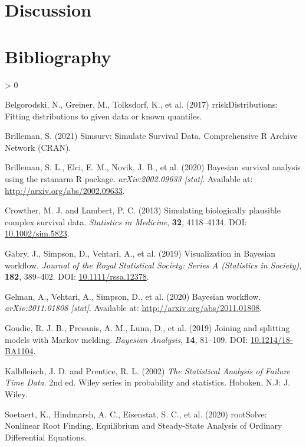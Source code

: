 \documentclass[
  10pt,
  a4paper,
]{article}
\newlength{\cslhangindent}
\newenvironment{CSLReferences}[2] %
 {%
  \setlength{\parindent}{0pt}
  \ifodd #1 \everypar{\setlength{\hangindent}{\cslhangindent}}\ignorespaces\fi
  \ifnum #2 > 0
  \setlength{\parskip}{#2\baselineskip}
  \fi
 }%
 {}
\begin{document}
\hypertarget{discussion}{%
\section{Discussion}\label{discussion}}

\hypertarget{bibliography}{%
\section{Bibliography}\label{bibliography}}

\hypertarget{refs}{}
\begin{CSLReferences}{1}{0}
\leavevmode\hypertarget{ref-belgorodski_rriskdistributions_2017}{}%
Belgorodski, N., Greiner, M., Tolksdorf, K., et al. (2017)
{rriskDistributions}: {Fitting} distributions to given data or known
quantiles.

\leavevmode\hypertarget{ref-brilleman_simsurv_2021}{}%
Brilleman, S. (2021) Simsurv: {Simulate Survival Data}. Comprehensive R
Archive Network (CRAN).

\leavevmode\hypertarget{ref-brilleman_bayesian_2020}{}%
Brilleman, S. L., Elci, E. M., Novik, J. B., et al. (2020) Bayesian
survival analysis using the rstanarm {R} package. \emph{arXiv:2002.09633
{[}stat{]}}. Available at: \url{http://arxiv.org/abs/2002.09633}.

\leavevmode\hypertarget{ref-crowther_simulating_2013}{}%
Crowther, M. J. and Lambert, P. C. (2013) Simulating biologically
plausible complex survival data. \emph{Statistics in Medicine},
\textbf{32}, 4118--4134. DOI:
\href{https://doi.org/10.1002/sim.5823}{10.1002/sim.5823}.

\leavevmode\hypertarget{ref-gabry_visualization_2019}{}%
Gabry, J., Simpson, D., Vehtari, A., et al. (2019) Visualization in
{Bayesian} workflow. \emph{Journal of the Royal Statistical Society:
Series A (Statistics in Society)}, \textbf{182}, 389--402. DOI:
\href{https://doi.org/10.1111/rssa.12378}{10.1111/rssa.12378}.

\leavevmode\hypertarget{ref-gelman_bayesian_2020}{}%
Gelman, A., Vehtari, A., Simpson, D., et al. (2020) Bayesian workflow.
\emph{arXiv:2011.01808 {[}stat{]}}. Available at:
\url{http://arxiv.org/abs/2011.01808}.

\leavevmode\hypertarget{ref-goudie_joining_2019}{}%
Goudie, R. J. B., Presanis, A. M., Lunn, D., et al. (2019) Joining and
splitting models with {Markov} melding. \emph{Bayesian Analysis},
\textbf{14}, 81--109. DOI:
\href{https://doi.org/10.1214/18-BA1104}{10.1214/18-BA1104}.

\leavevmode\hypertarget{ref-kalbfleisch_statistical_2002}{}%
Kalbfleisch, J. D. and Prentice, R. L. (2002) \emph{The Statistical
Analysis of Failure Time Data}. 2nd ed. Wiley series in probability and
statistics. {Hoboken, N.J}: {J. Wiley}.

\leavevmode\hypertarget{ref-soetaert_rootsolve_2020}{}%
Soetaert, K., Hindmarsh, A. C., Eisenstat, S. C., et al. (2020)
{rootSolve}: {Nonlinear Root Finding}, {Equilibrium} and {Steady}-{State
Analysis} of {Ordinary Differential Equations}.

\end{CSLReferences}
\end{document}
